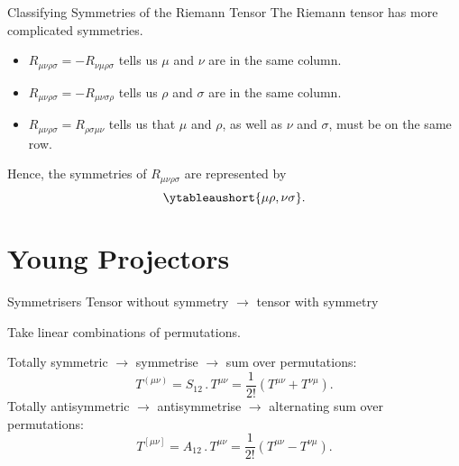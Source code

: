 \documentclass{beamer}
\newcommand{\groupAction}{\mathbin{.}}
\begin{document}
    \begin{frame}{Classifying Symmetries of the Riemann Tensor}
        The Riemann tensor has more complicated symmetries.
        \begin{itemize}
            \item \(R_{\mu\nu\rho\sigma} = -R_{\nu\mu\rho\sigma}\) tells us \(\mu\) and \(\nu\) are in the same column.
            \item \(R_{\mu\nu\rho\sigma} = -R_{\mu\nu\sigma\rho}\) tells us \(\rho\) and \(\sigma\) are in the same column.
            \item \(R_{\mu\nu\rho\sigma} = R_{\rho\sigma\mu\nu}\) tells us that \(\mu\) and \(\rho\), as well as \(\nu\) and \(\sigma\), must be on the same row.
        \end{itemize}
        \pause
        Hence, the symmetries of \(R_{\mu\nu\rho\sigma}\) are represented by
        \begin{equation*}
            \ytableaushort{\mu\rho,\nu\sigma}.
        \end{equation*}
    \end{frame}
    
    \section{Young Projectors}
    \begin{frame}{Symmetrisers}
        Tensor without symmetry \(\to\) tensor with symmetry
        
        Take linear combinations of permutations.
        
        \pause
        Totally symmetric \(\to\) symmetrise \(\to\) sum over permutations:
        \begin{equation*}
            T^{(\mu\nu)} = S_{12} \groupAction T^{\mu\nu} = \frac{1}{2!}(T^{\mu\nu} + T^{\nu\mu}).
        \end{equation*}
        \pause
        Totally antisymmetric \(\to\) antisymmetrise \(\to\) alternating sum over permutations:
        \begin{equation*}
            T^{[\mu\nu]} = A_{12} \groupAction T^{\mu\nu} = \frac{1}{2!}(T^{\mu\nu} - T^{\nu\mu}).
        \end{equation*}
    \end{frame}
    
\end{document}
